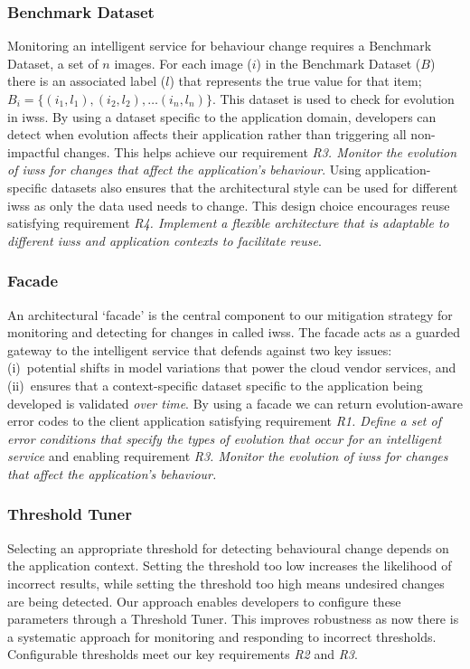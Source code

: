 \subsubsection{Benchmark Dataset} Monitoring an intelligent service for behaviour change requires a Benchmark Dataset, a set of $n$ images. For each image ($i$) in the Benchmark Dataset ($B$) there is an associated label ($l$) that represents the true value for that item; $B_{i} = \{(i_{1}, l_{1}), (i_{2}, l_{2}), \dots (i_{n}, l_{n})\}$. This dataset is used to check for evolution in \glspl{iws}. By using a dataset specific to the application domain, developers can detect when evolution affects their application rather than triggering all non-impactful changes. This helps achieve our requirement \textit{R3. Monitor the evolution of \glspl{iws} for changes that affect the application’s behaviour}. Using application-specific datasets also ensures that the architectural style can be used for different \glspl{iws} as only the data used needs to change. This design choice encourages reuse satisfying requirement \textit{R4. Implement a flexible architecture that is adaptable to different \glspl{iws} and application contexts to facilitate reuse}.

\subsubsection{Facade } An architectural `facade' is the central component to our mitigation strategy for monitoring and detecting for changes in called \glspl{iws}. The facade acts as a guarded gateway to the intelligent service that defends against two key issues: (i)~potential shifts in model variations that power the cloud vendor services, and (ii)~ensures that a context-specific dataset specific to the application being developed is validated \textit{over time}. By using a facade we can return evolution-aware error codes to the client application satisfying requirement \textit{R1. Define a set of error conditions that specify the types of evolution that occur for an intelligent service} and enabling requirement \textit{R3.  Monitor the evolution of \glspl{iws} for changes that affect the application’s behaviour.}



\subsubsection{Threshold Tuner} Selecting an appropriate threshold for detecting behavioural change depends on the application context. Setting the threshold too low increases the likelihood of incorrect results, while setting the threshold too high means undesired changes are being detected. Our approach enables developers to configure these parameters through a Threshold Tuner. This improves robustness as now there is a systematic approach for monitoring and responding to incorrect thresholds. Configurable thresholds meet our key requirements \textit{R2} and \textit{R3}.  

